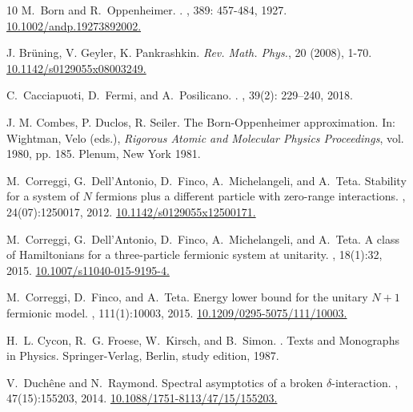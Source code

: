 \documentclass[a4paper,11pt,reqno]{amsart}
\theoremstyle{definition}
\numberwithin{equation}{section}
\begin{document}
\begin{thebibliography}{10}
M.~Born and R.~Oppenheimer.
.
, 389: 457-484, 1927. \href{https://doi.org/10.1002/andp.19273892002}{10.1002/andp.19273892002.}

J. Br\"uning,  V. Geyler, K. Pankrashkin.
{\em Rev. Math. Phys.}, 20 (2008), 1-70. \href{https://doi.org/10.1142/s0129055x08003249}{10.1142/s0129055x08003249.}

C.~Cacciapuoti, D.~Fermi, and A.~Posilicano.
.
, 39(2): 229--240, 2018.

 J. M. Combes, P. Duclos, R. Seiler.  
\newblock The Born-Oppenheimer approximation.
\newblock In: Wightman, Velo (eds.), {\em Rigorous Atomic and Molecular Physics Proceedings}, vol. 1980, pp. 185. Plenum, New York 1981.

M.~Correggi, G.~Dell'Antonio, D.~Finco, A.~Michelangeli, and A.~Teta.
\newblock Stability for a system of $N$ fermions plus a different particle with zero-range interactions.
, 24(07):1250017, 2012. \href{https://doi.org/10.1142/s0129055x12500171}{10.1142/s0129055x12500171.}

M.~Correggi, G.~Dell'Antonio, D.~Finco, A.~Michelangeli, and A.~Teta.
\newblock A class of Hamiltonians for a three-particle fermionic system at unitarity.
, 18(1):32, 2015. \href{https://doi.org/10.1007/s11040-015-9195-4}{10.1007/s11040-015-9195-4.}

M.~Correggi, D.~Finco, and A.~Teta.
\newblock Energy lower bound for the unitary $N+1$ fermionic model.
, 111(1):10003, 2015. \href{https://doi.org/10.1209/0295-5075/111/10003}{10.1209/0295-5075/111/10003.}

H.~L. Cycon, R.~G. Froese, W.~Kirsch, and B.~Simon.
.
\newblock Texts and Monographs in Physics. Springer-Verlag, Berlin, study
  edition, 1987.
  
V.~Duch\^{e}ne and N.~Raymond.
\newblock Spectral asymptotics of a broken $\delta$-interaction.
, 47(15):155203, 2014. \href{https://doi.org/10.1088/1751-8113/47/15/155203}{10.1088/1751-8113/47/15/155203.}


\end{thebibliography}
\end{document}
